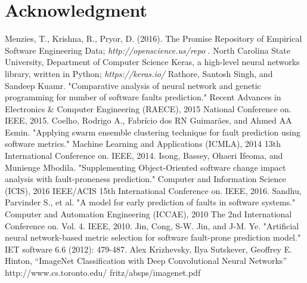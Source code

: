 \documentclass[10pt, conference, compsocconf]{IEEEtran}
\begin{document}
\section*{Acknowledgment}

\begin{thebibliography}{1}
 Menzies, T., Krishna, R., Pryor, D. (2016). The Promise Repository of Empirical Software Engineering Data; { \em http://openscience.us/repo }. North Carolina State University, Department of Computer Science
 Keras, a high-level neural networks library, written in Python; { \em https://keras.io/ }
 Rathore, Santosh Singh, and Sandeep Kuamr. "Comparative analysis of neural network and genetic programming for number of software faults prediction." Recent Advances in Electronics \& Computer Engineering (RAECE), 2015 National Conference on. IEEE, 2015.
 Coelho, Rodrigo A., Fabrício dos RN Guimarães, and Ahmed AA Esmin. "Applying swarm ensemble clustering technique for fault prediction using software metrics." Machine Learning and Applications (ICMLA), 2014 13th International Conference on. IEEE, 2014.
 Isong, Bassey, Ohaeri Ifeoma, and Munienge Mbodila. "Supplementing Object-Oriented software change impact analysis with fault-proneness prediction." Computer and Information Science (ICIS), 2016 IEEE/ACIS 15th International Conference on. IEEE, 2016.
 Sandhu, Parvinder S., et al. "A model for early prediction of faults in software systems." Computer and Automation Engineering (ICCAE), 2010 The 2nd International Conference on. Vol. 4. IEEE, 2010.
 Jin, Cong, S-W. Jin, and J-M. Ye. "Artificial neural network-based metric selection for software fault-prone prediction model." IET software 6.6 (2012): 479-487.
 Alex Krizhevsky, Ilya Sutskever, Geoffrey E. Hinton, “ImageNet Classification with Deep Convolutional Neural Networks” http://www.cs.toronto.edu/ fritz/absps/imagenet.pdf
\end{thebibliography}
\end{document}
